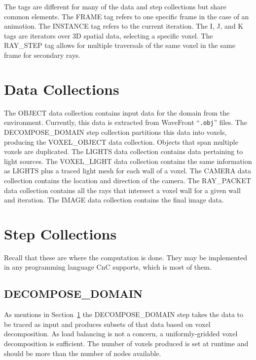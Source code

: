 The tags are different for many of the data and step collections but
share common elements. The FRAME tag refers to one specific frame in
the case of an animation. The INSTANCE tag refers to the current
iteration. The I, J, and K tags are iterators over 3D spatial data,
selecting a specific voxel. The RAY\_STEP tag allows for multiple
traversals of the same voxel in the same frame for secondary rays.

\section{Data Collections}
\label{sec:datacollections}

The OBJECT data collection contains input data for the domain from the
environment. Currently, this data is extracted from WaveFront
``\texttt{.obj}'' files. The DECOMPOSE\_DOMAIN step collection
partitions this data into voxels, producing the VOXEL\_OBJECT data
collection. Objects that span multiple voxels are duplicated. The
LIGHTS data collection contains data pertaining to light sources. The
VOXEL\_LIGHT data collection contains the same information as LIGHTS
plus a traced light mesh for each wall of a voxel. The CAMERA data
collection contains the location and direction of the camera. The
RAY\_PACKET data collection contains all the rays that intersect a
voxel wall for a given wall and iteration. The IMAGE data collection
contains the final image data.

\section{Step Collections}

Recall that these are where the computation is done. They may be
implemented in any programming language CnC supports, which is most of
them.

\subsection{DECOMPOSE\_DOMAIN}

As mentions in Section~\ref{sec:datacollections} the DECOMPOSE\_DOMAIN
step takes the data to be traced as input and produces subsets of that
data based on voxel decomposition. As load balancing is not a concern,
a uniformly-gridded voxel decomposition is sufficient. The number of
voxels produced is set at runtime and should be more than the number
of nodes available.

